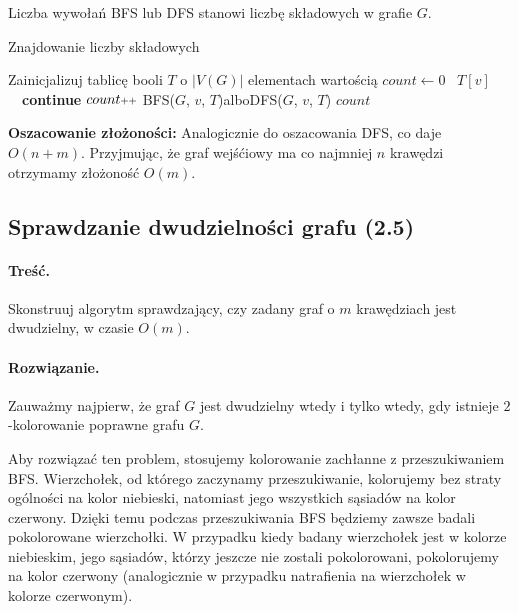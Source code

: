 Liczba wywołań BFS lub DFS stanowi liczbę składowych w grafie $G$.

\begin{algorithm}[H]
	\caption{Znajdowanie liczby składowych}\label{Zadanie24}
	\begin{algorithmic}[1]
		\State Zainicjalizuj tablicę booli $T$ o $|V(G)|$ elementach wartością \false
		\State $count\gets0$
			\State \algorithmicif\ $T[v]$\ \algorithmicthen\ \textbf{continue} %
			\State $count\pp$
			\State BFS($G$, $v$, $T$)\quad albo\quad DFS($G$, $v$, $T$)
		\EndFor
		\State \Return $count$
		\EndProcedure
	\end{algorithmic}
\end{algorithm}

\textbf{Oszacowanie złożoności:} Analogicznie do oszacowania DFS, co daje $O(n + m)$. Przyjmując, że
graf wejśćiowy ma co najmniej $n$ krawędzi otrzymamy złożoność  $O(m)$.

\subsection{Sprawdzanie dwudzielności grafu (2.5)}
\label{exc:bipart}
\paragraph{Treść.} Skonstruuj algorytm sprawdzający, 
czy zadany graf o $m$ krawędziach jest dwudzielny, w czasie $O(m)$.

\paragraph{Rozwiązanie.} Zauważmy najpierw, że 
graf $G$ jest dwudzielny wtedy i tylko wtedy, gdy istnieje $2$-kolorowanie
poprawne grafu $G$.  

Aby rozwiązać ten problem, stosujemy kolorowanie 
zachłanne z przeszukiwaniem BFS. 
Wierzchołek, od którego zaczynamy przeszukiwanie, kolorujemy bez straty
ogólności na kolor niebieski, natomiast jego wszystkich sąsiadów na kolor czerwony.
Dzięki temu podczas przeszukiwania BFS będziemy zawsze badali pokolorowane 
wierzchołki. W przypadku kiedy badany wierzchołek jest w kolorze niebieskim, jego 
sąsiadów, którzy jeszcze nie zostali pokolorowani, pokolorujemy na kolor czerwony (analogicznie
w przypadku natrafienia na wierzchołek w kolorze czerwonym).

